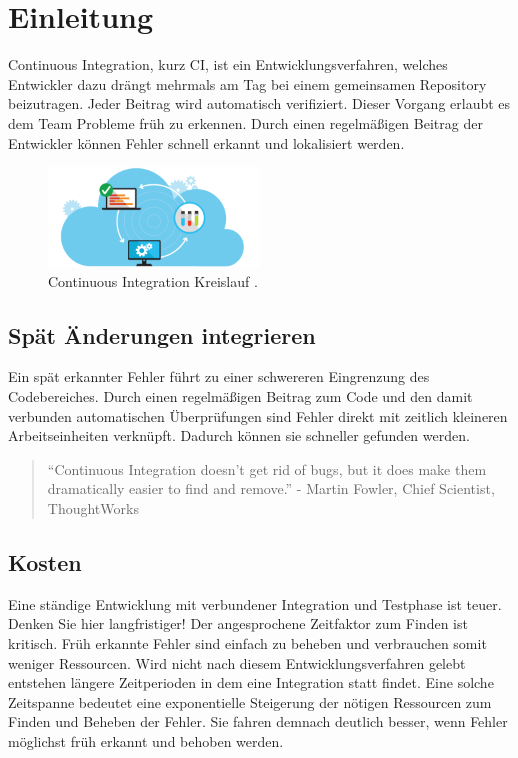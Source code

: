 \chapter{Einleitung}
Continuous Integration, kurz CI, ist ein Entwicklungsverfahren, welches Entwickler dazu drängt mehrmals am Tag bei einem gemeinsamen Repository beizutragen. Jeder Beitrag wird automatisch verifiziert. Dieser Vorgang erlaubt es dem Team Probleme früh zu erkennen.
Durch einen regelmäßigen Beitrag der Entwickler können Fehler schnell erkannt und lokalisiert werden.

\begin{figure}[!htb]
	\centerline{\includegraphics[width=0.5\textwidth]{img/ci}}
	\caption{Continuous Integration Kreislauf \cite{continuous-integration-circle}.}
	\label{ci}
\end{figure}

\section{Spät Änderungen integrieren}
Ein spät erkannter Fehler führt zu einer schwereren Eingrenzung des Codebereiches. Durch einen regelmäßigen Beitrag zum Code und den damit verbunden automatischen Überprüfungen sind Fehler direkt mit zeitlich kleineren Arbeitseinheiten verknüpft. Dadurch können sie schneller gefunden werden.

\begin{quote}
“Continuous Integration doesn’t get rid of bugs, but it does make them dramatically easier to find and remove.” - Martin Fowler, Chief Scientist, ThoughtWorks \cite{continuous-integration-thoughtworks}
\end{quote}

\section{Kosten}
Eine ständige Entwicklung mit verbundener Integration und Testphase ist teuer. Denken Sie hier langfristiger! Der angesprochene Zeitfaktor zum Finden ist kritisch. Früh erkannte Fehler sind einfach zu beheben und verbrauchen somit weniger Ressourcen. Wird nicht nach diesem Entwicklungsverfahren gelebt entstehen längere Zeitperioden in dem eine Integration statt findet. Eine solche Zeitspanne bedeutet eine exponentielle Steigerung der nötigen Ressourcen zum Finden und Beheben der Fehler. Sie fahren demnach deutlich besser, wenn Fehler möglichst früh erkannt und behoben werden.

